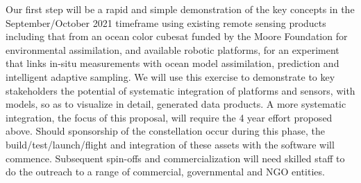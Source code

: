 \fi

\ifkeck
\else
Our first step will be a rapid and simple demonstration of the key
concepts in the September/October 2021 timeframe using existing remote
sensing products including that from an ocean color cubesat funded by
the Moore Foundation for environmental assimilation, and available
robotic platforms, for an experiment that links in-situ measurements
with ocean model assimilation, prediction and intelligent adaptive
sampling. We will use this exercise to demonstrate to key stakeholders
the potential of systematic integration of platforms and sensors, with
models, so as to visualize in detail, generated data products. A more
systematic integration, the focus of this proposal, will require the 4
year effort proposed above. Should sponsorship of the \sml
constellation occur during this phase, the build/test/launch/flight
and integration of these assets with the software will
commence. Subsequent spin-offs and commercialization will need skilled
staff to do the outreach to a range of commercial, governmental and
NGO entities.
\fi






